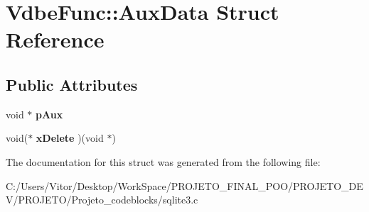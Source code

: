 \hypertarget{struct_vdbe_func_1_1_aux_data}{\section{Vdbe\-Func\-:\-:Aux\-Data Struct Reference}
\label{struct_vdbe_func_1_1_aux_data}
}
\subsection*{Public Attributes}
\begin{DoxyCompactItemize}
\item 
\hypertarget{struct_vdbe_func_1_1_aux_data_ad2ceeac1dec76bbb661f6418ec582539}{void $\ast$ {\bfseries p\-Aux}}\label{struct_vdbe_func_1_1_aux_data_ad2ceeac1dec76bbb661f6418ec582539}

\item 
\hypertarget{struct_vdbe_func_1_1_aux_data_a6742f89d0634b5fc6684f245bac76fd5}{void($\ast$ {\bfseries x\-Delete} )(void $\ast$)}\label{struct_vdbe_func_1_1_aux_data_a6742f89d0634b5fc6684f245bac76fd5}

\end{DoxyCompactItemize}


The documentation for this struct was generated from the following file\-:\begin{DoxyCompactItemize}
\item 
C\-:/\-Users/\-Vitor/\-Desktop/\-Work\-Space/\-P\-R\-O\-J\-E\-T\-O\-\_\-\-F\-I\-N\-A\-L\-\_\-\-P\-O\-O/\-P\-R\-O\-J\-E\-T\-O\-\_\-\-D\-E\-V/\-P\-R\-O\-J\-E\-T\-O/\-Projeto\-\_\-codeblocks/sqlite3.\-c\end{DoxyCompactItemize}
